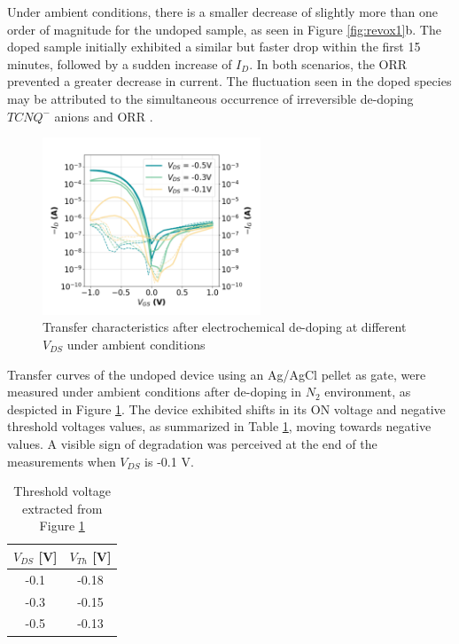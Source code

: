 Under ambient conditions, there is a smaller decrease of slightly more than one order of magnitude for the undoped sample, as seen in Figure \ref{fig:revox1}b. The doped sample initially exhibited a similar but faster drop within the first 15 minutes, followed by a sudden increase of $I_{D}$. In both scenarios, the ORR prevented a greater decrease in current. The fluctuation seen in the doped species may be attributed to the simultaneous occurrence of irreversible de-doping $TCNQ^{-}$ anions and ORR . %

\begin{figure}[ht]
    \centering
    \includegraphics[width=6.5cm]{Images/pdf/revox_transfer_loop2.pdf}%
    \caption[Transfer characteristics after electrochemical de-doping]{Transfer characteristics after electrochemical de-doping at different $V_{DS}$ under ambient conditions}
    \label{fig:transrevox1}
\end{figure}

Transfer curves of the undoped device using an Ag/AgCl pellet as gate, were measured under ambient conditions after de-doping in $N_{2}$ environment, as despicted in Figure \ref{fig:transrevox1}. The device exhibited shifts in its ON voltage and negative threshold voltages values, as summarized in Table \ref{tab:vth_air}, moving towards negative values. A visible sign of degradation was perceived at the end of the measurements when $V_{DS}$ is -0.1 V.

\begin{table}[ht]
\centering
\caption{Threshold voltage extracted from Figure \ref{fig:transrevox1}}
\begin{tabular}{c|c}
 $V_{DS}$ [V] & $V_{Th}$ [V] \\\hline
-0.1 & -0.18 \\
-0.3 & -0.15 \\
-0.5 & -0.13 \\ \hline
\end{tabular}
\label{tab:vth_air}
\end{table}

